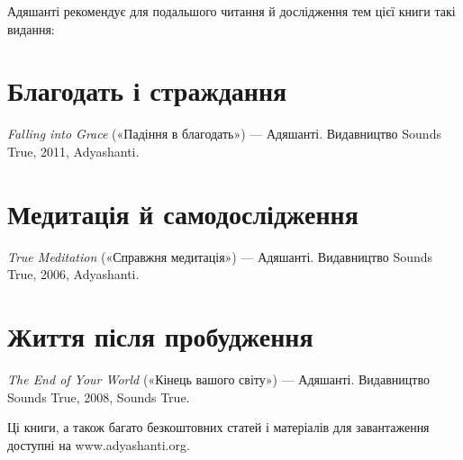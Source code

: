 Адяшанті рекомендує для подальшого читання й дослідження тем цієї книги такі видання:

\section*{Благодать і страждання}

\emph{Falling into Grace} («Падіння в благодать») — Адяшанті. Видавництво Sounds True, \textcopyright{} 2011, Adyashanti.

\section*{Медитація й самодослідження}

\emph{True Meditation} («Справжня медитація») — Адяшанті. Видавництво Sounds True, \textcopyright{} 2006, Adyashanti.

\section*{Життя після пробудження}

\emph{The End of Your World} («Кінець вашого світу») — Адяшанті. Видавництво Sounds True, \textcopyright{} 2008, Sounds True.

Ці книги, а також багато безкоштовних статей і матеріалів для завантаження доступні на www.adyashanti.org.
